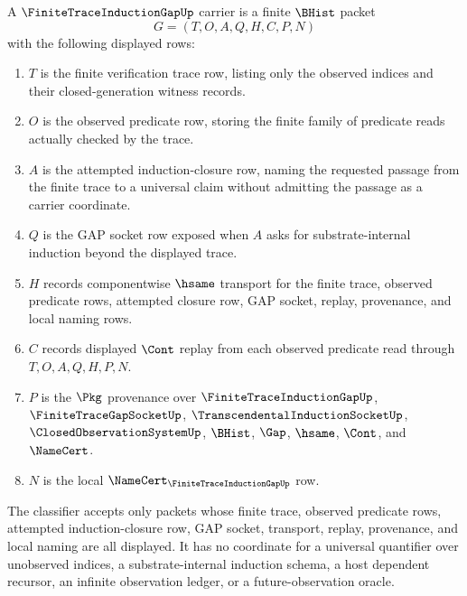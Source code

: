 \begin{definition}
\label{def:finite-trace-induction-gap-carrier}
A $\FiniteTraceInductionGapUp$ carrier is a finite $\BHist$ packet
$$
G=(T,O,A,Q,H,C,P,N)
$$
with the following displayed rows:
\begin{enumerate}
\item $T$ is the finite verification trace row, listing only the observed indices and their closed-generation witness records.
\item $O$ is the observed predicate row, storing the finite family of predicate reads actually checked by the trace.
\item $A$ is the attempted induction-closure row, naming the requested passage from the finite trace to a universal claim without admitting the passage as a carrier coordinate.
\item $Q$ is the GAP socket row exposed when $A$ asks for substrate-internal induction beyond the displayed trace.
\item $H$ records componentwise $\hsame$ transport for the finite trace, observed predicate rows, attempted closure row, GAP socket, replay, provenance, and local naming rows.
\item $C$ records displayed $\Cont$ replay from each observed predicate read through $T,O,A,Q,H,P,N$.
\item $P$ is the $\Pkg$ provenance over $\FiniteTraceInductionGapUp$, $\FiniteTraceGapSocketUp$, $\TranscendentalInductionSocketUp$, $\ClosedObservationSystemUp$, $\BHist$, $\Gap$, $\hsame$, $\Cont$, and $\NameCert$.
\item $N$ is the local $\NameCert_{\FiniteTraceInductionGapUp}$ row.
\end{enumerate}
The classifier accepts only packets whose finite trace, observed predicate rows, attempted induction-closure row, GAP socket, transport, replay, provenance, and local naming are all displayed. It has no coordinate for a universal quantifier over unobserved indices, a substrate-internal induction schema, a host dependent recursor, an infinite observation ledger, or a future-observation oracle.
\end{definition}

